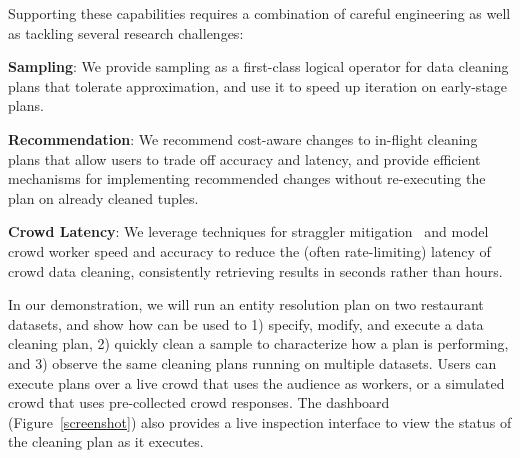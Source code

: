 Supporting these capabilities requires a combination of careful engineering 
as well as tackling several research challenges:

\squishlist
\item \textbf{Sampling}: We provide sampling as a first-class logical operator for data cleaning plans that tolerate approximation, and use it to speed up iteration on early-stage plans.

\item \textbf{Recommendation}: We recommend cost-aware changes to in-flight cleaning plans that allow users to trade off accuracy and latency, and provide efficient mechanisms for implementing recommended changes without re-executing the plan on already cleaned tuples.

\item \textbf{Crowd Latency}: We leverage techniques for straggler mitigation~\cite{venkataraman2014power} and model crowd worker speed and accuracy to reduce the (often rate-limiting) latency of crowd data cleaning, consistently retrieving results in seconds rather than hours.
\squishend

In our demonstration, we will run an entity resolution plan on two restaurant datasets, and
show how \sys can be used to 1) specify, modify, and execute a data cleaning plan,
2) quickly clean a sample to characterize how a plan is performing, and
3) observe the same cleaning plans running on multiple datasets.
Users can execute plans over a live crowd that uses the audience as workers, or a simulated crowd
that uses pre-collected crowd responses. The dashboard (Figure~\ref{screenshot}) also provides a live inspection
interface to view the status of the cleaning plan as it executes.

\vspace{-0.2cm}



